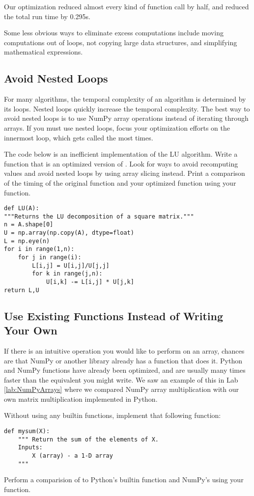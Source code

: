 Our optimization reduced almost every kind of function call by half, and reduced the total run time by 0.295s.

Some less obvious ways to eliminate excess computations include moving computations out of loops, not copying large data structures, and simplifying mathematical expressions.

\subsection*{Avoid Nested Loops}
For many algorithms, the temporal complexity of an algorithm is determined by its loops. Nested loops quickly increase the temporal complexity.
The best way to avoid nested loops is to use NumPy array operations instead of iterating through arrays.
If you must use nested loops, focus your optimization efforts on the innermost loop, which gets called the most times.

\begin{problem}
The code below is an inefficient implementation of the LU
algorithm. Write a function  that is an optimized
version of . Look for ways to avoid recomputing values
and avoid nested loops by using array slicing instead.
Print a comparison of the timing of the
original function and your optimized function using your
 function.
\begin{lstlisting}
def LU(A):
"""Returns the LU decomposition of a square matrix."""
n = A.shape[0]
U = np.array(np.copy(A), dtype=float)
L = np.eye(n)
for i in range(1,n):
    for j in range(i):
        L[i,j] = U[i,j]/U[j,j]
        for k in range(j,n):
            U[i,k] -= L[i,j] * U[j,k]
return L,U
\end{lstlisting}
\end{problem}

\subsection*{Use Existing Functions Instead of Writing Your Own}
If there is an intuitive operation you would like to perform on an array, chances are that NumPy or another library already has a function that does it.
Python and NumPy functions have already been optimized, and are usually many times faster than the equivalent you might write.
We saw an example of this in Lab \ref{lab:NumPyArrays} where we compared NumPy array multiplication with our own matrix multiplication implemented in Python.

\begin{problem} \label{prob:add}
Without using any builtin functions, implement that following function:
\begin{lstlisting}
def mysum(X):
    """ Return the sum of the elements of X.
    Inputs:
        X (array) - a 1-D array
    """
\end{lstlisting}
Perform a comparision of  to Python's builtin  function and
NumPy's  using your  function.
\end{problem}

